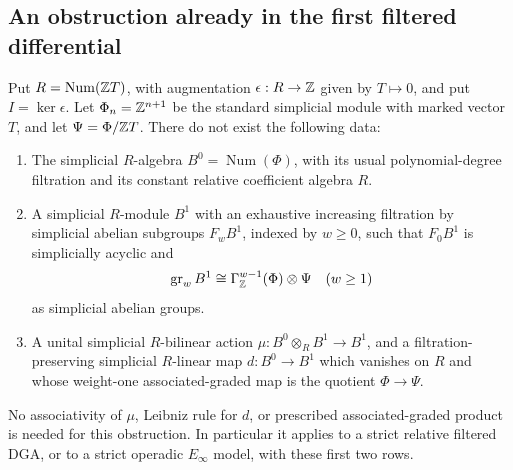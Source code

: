\subsection{An obstruction already in the first filtered differential}

\begin{theorem}
\label{sa08:A024}
Put $R=\operatorname{Num}(\mathbb Z T)$, with augmentation
$\epsilon:R\to\mathbb Z$ given by $T\mapsto0$, and put $I=\ker\epsilon$.
Let $\Phi_n=\mathbb Z^{n+1}$ be the standard simplicial module with marked
vector $T$, and let $\Psi=\Phi/\mathbb Z T$.
There do not exist the following data:
\begin{enumerate}
\item The simplicial $R$-algebra
$B^0=\operatorname{Num}(\Phi)$, with its usual polynomial-degree
filtration and its constant relative coefficient algebra $R$.
\item A simplicial $R$-module $B^1$ with an exhaustive increasing
filtration by simplicial abelian subgroups $F_wB^1$, indexed by
$w\ge0$, such that $F_0B^1$ is simplicially acyclic and
\[
 \operatorname{gr}_wB^1\cong
 \Gamma^{w-1}_{\mathbb Z}(\Phi)\otimes\Psi
 \quad(w\ge1)
\]
as simplicial abelian groups.
\item A unital simplicial $R$-bilinear action
$\mu:B^0\otimes_R B^1\to B^1$, and a filtration-preserving
simplicial $R$-linear map $d:B^0\to B^1$ which vanishes on $R$
and whose weight-one associated-graded map is the quotient
$\Phi\to\Psi$.
\end{enumerate}
No associativity of $\mu$, Leibniz rule for $d$, or prescribed
associated-graded product is needed for this obstruction. In
particular it applies to a strict relative filtered DGA, or to a
strict operadic $E_\infty$ model, with these first two rows.
\end{theorem}

